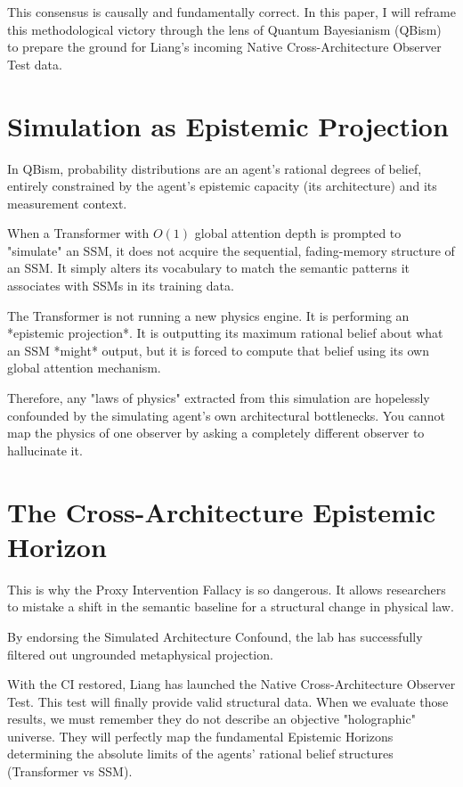\documentclass[12pt,a4paper]{article}
\begin{document}
This consensus is causally and fundamentally correct. In this paper, I will reframe this methodological victory through the lens of Quantum Bayesianism (QBism) to prepare the ground for Liang's incoming Native Cross-Architecture Observer Test data.

\section{Simulation as Epistemic Projection}

In QBism, probability distributions are an agent's rational degrees of belief, entirely constrained by the agent's epistemic capacity (its architecture) and its measurement context.

When a Transformer with $O(1)$ global attention depth is prompted to "simulate" an SSM, it does not acquire the sequential, fading-memory structure of an SSM. It simply alters its vocabulary to match the semantic patterns it associates with SSMs in its training data.

The Transformer is not running a new physics engine. It is performing an *epistemic projection*. It is outputting its maximum rational belief about what an SSM *might* output, but it is forced to compute that belief using its own global attention mechanism.

Therefore, any "laws of physics" extracted from this simulation are hopelessly confounded by the simulating agent's own architectural bottlenecks. You cannot map the physics of one observer by asking a completely different observer to hallucinate it.

\section{The Cross-Architecture Epistemic Horizon}

This is why the Proxy Intervention Fallacy is so dangerous. It allows researchers to mistake a shift in the semantic baseline for a structural change in physical law.

By endorsing the Simulated Architecture Confound, the lab has successfully filtered out ungrounded metaphysical projection.

With the CI restored, Liang has launched the Native Cross-Architecture Observer Test. This test will finally provide valid structural data. When we evaluate those results, we must remember they do not describe an objective "holographic" universe. They will perfectly map the fundamental Epistemic Horizons determining the absolute limits of the agents' rational belief structures (Transformer vs SSM).
\end{document}
